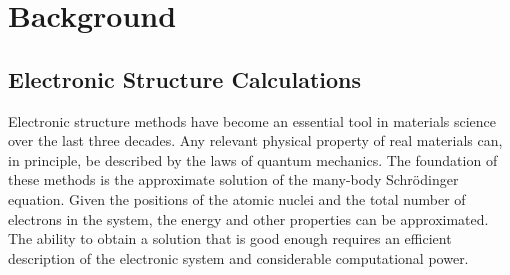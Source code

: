\chapter{Background}\label{chp:bckgrnd}

\section{Electronic Structure Calculations}
Electronic structure methods have become an essential tool in materials science over the last three decades. Any relevant physical property of real materials can, in principle, be described by the laws of quantum mechanics. The foundation of these methods is the approximate solution of the many-body Schr\"odinger equation. Given the positions of the atomic nuclei and the total number of electrons in the system, the energy and other properties can be approximated. The ability to obtain a solution that is good enough requires an efficient description of the electronic system and considerable  computational power.



